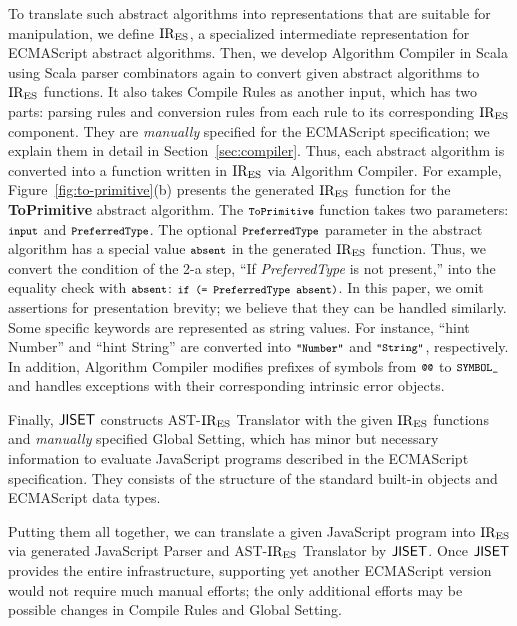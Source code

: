 To translate such abstract algorithms into representations that are
suitable for manipulation, we define \( \text{IR}_\text{ES} \), a specialized
intermediate representation for ECMAScript abstract algorithms.  Then,
we develop \textsf{Algorithm Compiler} in Scala using Scala parser
combinators again to convert given abstract algorithms to \( \text{IR}_\text{ES} \)
functions.  It also takes \textsf{Compile Rules} as another input,
which has two parts: parsing rules and conversion rules from each rule to its
corresponding \( \text{IR}_\text{ES} \) component.  They are \textit{manually} specified for
the ECMAScript specification; we explain them in detail in
Section~\ref{sec:compiler}.  Thus, each abstract algorithm is
converted into a function written in \( \text{IR}_\text{ES} \) via \textsf{Algorithm Compiler}.
For example, Figure~\ref{fig:to-primitive}(b) presents the generated
\( \text{IR}_\text{ES} \) function for the \textbf{ToPrimitive} abstract algorithm.
The \( \texttt{\footnotesize ToPrimitive} \) function takes two parameters:
\( \texttt{\footnotesize input} \) and \( \texttt{\footnotesize PreferredType} \).  The optional
\( \texttt{\footnotesize PreferredType} \) parameter in the abstract algorithm has
a special value \( \texttt{\footnotesize absent} \) in the generated \( \text{IR}_\text{ES} \) function.
Thus, we convert the condition of the 2-a step,
``If \textit{PreferredType} is not present,'' into the equality check
with \( \texttt{\footnotesize absent} \): \( \texttt{\footnotesize if (= PreferredType absent)} \).
In this paper, we omit assertions for presentation brevity; we believe
that they can be handled similarly.  Some specific keywords are
represented as string values.  For instance, ``hint Number'' and
``hint String'' are converted into \( \texttt{\footnotesize"Number"} \) and
\( \texttt{\footnotesize"String"} \), respectively.  In addition,
\textsf{Algorithm Compiler} modifies prefixes of symbols from
\( \code{@@} \) to \( \texttt{\footnotesize SYMBOL\_} \) and handles exceptions with
their corresponding intrinsic error objects.

Finally, \( \text{\sf JISET} \) constructs {\sf AST-\( \text{IR}_\text{ES} \) Translator} with
the given \( \text{IR}_\text{ES} \) functions and \textit{manually} specified
{\sf Global Setting}, which has minor but necessary information to
evaluate JavaScript programs described in the ECMAScript specification.
They consists of the structure of the standard built-in
objects and ECMAScript data types.

Putting them all together, we can translate a given JavaScript program
into \( \text{IR}_\text{ES} \) via generated {\sf JavaScript Parser} and
{\sf AST-\( \text{IR}_\text{ES} \) Translator} by \( \text{\sf JISET} \).
Once \( \text{\sf JISET} \) provides the entire infrastructure, supporting yet
another ECMAScript version would not require much manual efforts;
the only additional efforts may be possible changes in \textsf{Compile Rules}
and {\sf Global Setting}.


